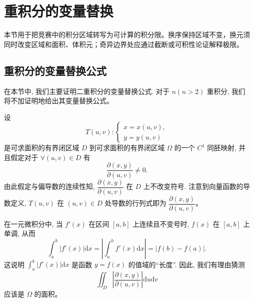 \documentclass[12pt,fontset=fandol]{ctexart}
\begin{document}
\section{重积分的变量替换}\label{course-15-4}
本节用于把竞赛中的积分区域转写为可计算的积分限。换序保持区域不变，换元须同时改变区域和面积、体积元；奇异边界处应通过截断或可积性论证解释极限。

\subsection{重积分的变量替换公式}

在本节中, 我们主要证明二重积分的变量替换公式. 对于 $n(n>2)$ 重积分, 我们将不加证明地给出其变量替换公式。

设
\[
  T(u,v):
  \begin{cases}
    x=x(u,v),\\
    y=y(u,v)
  \end{cases}
\]
是可求面积的有界闭区域 $D$ 到可求面积的有界闭区域 $\Omega$ 的一个 $C^1$ 同胚映射, 并且假定对于 $\forall(u,v)\in D$ 有
\[
  \frac{\partial(x,y)}{\partial(u,v)}\ne0.
\]
由此假定与偏导数的连续性知, $\dfrac{\partial(x,y)}{\partial(u,v)}$ 在 $D$ 上不改变符号. 注意到向量函数的导数定义, $T(u,v)$ 在 $(u,v)\in D$ 处导数的行列式即为 $\dfrac{\partial(x,y)}{\partial(u,v)}$。

在一元微积分中, 当 $f'(x)$ 在区间 $[a,b]$ 上连续且不变号时, $f(x)$ 在 $[a,b]$ 上单调, 从而
\[
  \int_a^b|f'(x)|\mathrm dx
  =\left|\int_a^bf'(x)\mathrm dx\right|
  =|f(b)-f(a)|.
\]
这说明 $\int_a^b|f'(x)|\mathrm dx$ 是函数 $y=f(x)$ 的值域的“长度”. 因此, 我们有理由猜测
\[
  \iint_D\left|\frac{\partial(x,y)}{\partial(u,v)}\right|\mathrm du\mathrm dv
\]
应该是 $\Omega$ 的面积。
\end{document}

